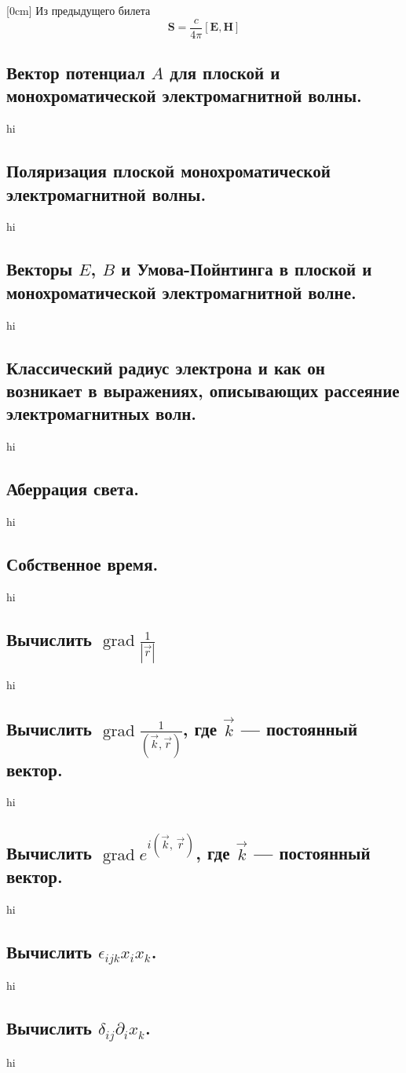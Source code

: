 \documentclass[a4paper,12pt]{article}
\begin{document}
[0cm]
Из предыдущего билета \[\mathbf{S}=\frac{c}{4\pi}[\mathbf{E},\mathbf{H}]\]
\subsection{Вектор потенциал $A$ для плоской и монохроматической
электромагнитной
волны.}
hi
\subsection{Поляризация плоской монохроматической электромагнитной волны.}
hi
\subsection{Векторы $E$, $B$ и Умова-Пойнтинга в плоской и монохроматической
электромагнитной волне.}
hi
\subsection{Классический радиус электрона и как он возникает в выражениях,
описывающих рассеяние электромагнитных волн.}
hi
\subsection{Аберрация света.}
hi
\subsection{Собственное время.}
hi
\subsection{Вычислить $\operatorname{grad} \frac{1}{\left| \vec{r} \right| }$}
hi
\subsection{Вычислить $\operatorname{grad}
	\frac{1}{\left( \vec{k},\vec{r}\right)}
$, где $\vec{k}$ --- постоянный вектор.}
hi
\subsection{Вычислить $\operatorname{grad} e ^{i\left( \vec{k},\,\vec{r}
\right) }$, где $\vec{k}$ --- постоянный вектор.}
hi
\subsection{Вычислить $\epsilon_{ijk}x_i x_k$.}
hi
\subsection{Вычислить $\delta_{ij}\partial_i x_k$.}
hi
\end{document}

